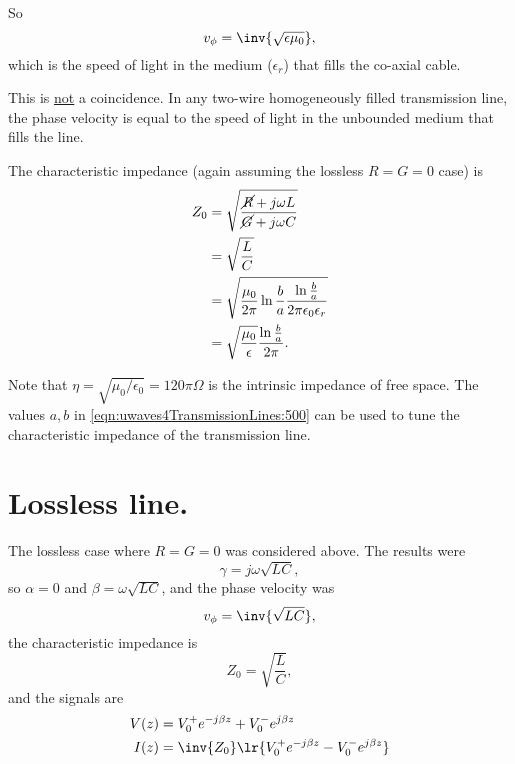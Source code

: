 {So
\begin{equation}\label{eqn:uwaves4TransmissionLines:480}
v_\phi = \inv{\sqrt{\epsilon \mu_0}},
\end{equation}
which is the speed of light in the medium (\(\epsilon_r\)) that fills the co-axial cable.

This is \underline{not} a coincidence.  In any two-wire homogeneously filled transmission line, the phase velocity is equal to the speed of light in the unbounded medium that fills the line.

The characteristic impedance (again assuming the lossless \( R = G = 0 \) case) is
\begin{equation}\label{eqn:uwaves4TransmissionLines:500}
\begin{aligned}
Z_0
&= \sqrt{ \frac{\cancel{R} + j \omega L}{\cancel{G} + j \omega C} }
\\ &= \sqrt{ \frac{L}{C} }
\\ &= \sqrt{
\frac{\mu_0}{ 2 \pi } \ln \frac{b}{a}
\frac{ \ln \frac{b}{a} }
{2 \pi \epsilon_0 \epsilon_r }
}
\\ &=
\sqrt{ \frac{\mu_0}{\epsilon} } \frac{ \ln \frac{b}{a} }{ 2 \pi }.
\end{aligned}
\end{equation}

Note that \( \eta = \sqrt{\mu_0/\epsilon_0} = 120 \pi \Omega \) is the intrinsic impedance of free space.  The values \( a, b \) in \cref{eqn:uwaves4TransmissionLines:500} can be used to tune the characteristic impedance of the transmission line.
} %
\section{Lossless line.}
The lossless case where \( R = G = 0 \) was considered above.  The results were
\begin{equation}\label{eqn:uwaves4TransmissionLines:540}
\gamma = j \omega \sqrt{ L C },
\end{equation}
so \( \alpha = 0 \) and \( \beta = \omega \sqrt{LC} \), and the phase velocity was
\begin{equation}\label{eqn:uwaves4TransmissionLines:560}
v_\phi = \inv{\sqrt{LC}},
\end{equation}
the characteristic impedance is
\begin{equation}\label{eqn:uwaves4TransmissionLines:580}
Z_0 = \sqrt{\frac{L}{C}},
\end{equation}
and the signals are
\begin{equation}\label{eqn:uwaves4TransmissionLines:600}
\begin{aligned}
V(z) &= V_0^{+} e^{-j \beta z} + V_0^{-} e^{j \beta z} \\
I(z) &= \inv{Z_0} \lr{ V_0^{+} e^{-j \beta z} - V_0^{-} e^{j \beta z} }
\end{aligned}
\end{equation}

